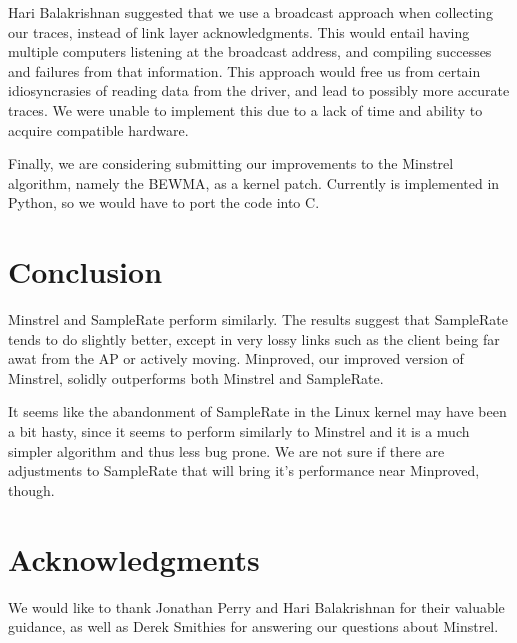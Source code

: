 \documentclass[letterpaper,twocolumn,10pt]{article}
\begin{document}
Hari Balakrishnan suggested that we use a broadcast approach when
collecting our traces, instead of link layer acknowledgments. This
would entail having multiple computers listening at the broadcast
address, and compiling successes and failures from that
information. This approach would free us from certain idiosyncrasies
of reading data from the driver, and lead to possibly more accurate
traces. We were unable to implement this due to a lack of time and
ability to acquire compatible hardware.

Finally, we are considering submitting our improvements to the
Minstrel algorithm, namely the BEWMA, as a kernel patch. Currently is
implemented in Python, so we would have to port the code into C.

\section{Conclusion}

Minstrel and SampleRate perform similarly. The results suggest that
SampleRate tends to do slightly better, except in very lossy links
such as the client being far awat from the AP or actively
moving. Minproved, our improved version of Minstrel, solidly
outperforms both Minstrel and SampleRate.

It seems like the abandonment of SampleRate in the Linux kernel may
have been a bit hasty, since it seems to perform similarly to Minstrel
and it is a much simpler algorithm and thus less bug prone. We are not
sure if there are adjustments to SampleRate that will bring it's
performance near Minproved, though.

\section{Acknowledgments}

We would like to thank Jonathan Perry and Hari Balakrishnan for their
valuable guidance, as well as Derek Smithies for answering our
questions about Minstrel.


{\footnotesize 
}
\end{document}
